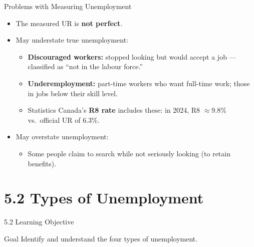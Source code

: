 \documentclass[aspectratio=169]{beamer}
\begin{document}
\begin{frame}{Problems with Measuring Unemployment}
\transfade
\begin{itemize}[<+->]
  \item The measured UR is \textbf{not perfect}.
  \item May \alert{understate} true unemployment:
  \begin{itemize}[<+->]
    \item \textbf{Discouraged workers:} stopped looking but would accept a job --- classified as ``not in the labour force.''
    \item \textbf{Underemployment:} part-time workers who want full-time work; those in jobs below their skill level.
    \item Statistics Canada's \textbf{R8 rate} includes these: in 2024, R8 $\approx$9.8\% vs.\ official UR of 6.3\%.
  \end{itemize}
  \item May \alert{overstate} unemployment:
  \begin{itemize}[<+->]
    \item Some people claim to search while not seriously looking (to retain benefits).
  \end{itemize}
\end{itemize}
\end{frame}

\section{5.2 Types of Unemployment}

\begin{frame}{5.2 Learning Objective}
\transfade
\begin{block}{Goal}
Identify and understand the four types of unemployment.
\end{block}
\end{frame}
\end{document}
